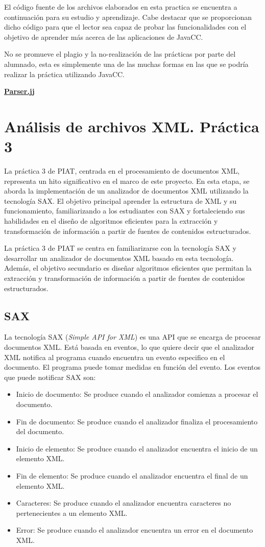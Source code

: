 \noindent El código fuente de los archivos elaborados en esta practica se encuentra a continuación para su estudio y aprendizaje. Cabe destacar que se proporcionan dicho código para que el lector sea capaz de probar las funcionalidades con el objetivo de aprender más acerca de las aplicaciones de JavaCC.

No se promueve el plagio y la no-realización de las prácticas por parte del alumnado, esta es simplemente una de las muchas formas en las que se podría realizar la práctica utilizando JavaCC.

\hyperref[sec:P2Parser]{\textbf{Parser.jj}}

\section{Análisis de archivos XML. Práctica 3}

\noindent La práctica 3 de PIAT, centrada en el procesamiento de documentos XML, representa un hito significativo en el marco de este proyecto. En esta etapa, se aborda la implementación de un analizador de documentos XML utilizando la tecnología SAX. El objetivo principal aprender la estructura de XML y su funcionamiento, familiarizando a los estudiantes con SAX y fortaleciendo sus habilidades en el diseño de algoritmos eficientes para la extracción y transformación de información a partir de fuentes de contenidos estructurados.

La práctica 3 de PIAT se centra en familiarizarse con la tecnología SAX y desarrollar un analizador de documentos XML basado en esta tecnología. Además, el objetivo secundario es diseñar algoritmos eficientes que permitan la extracción y transformación de información a partir de fuentes de contenidos estructurados.

\subsection{SAX}
\noindent La tecnología SAX (\textit{Simple API for XML}) es una API que se encarga de procesar documentos XML. Está basada en eventos, lo que quiere decir que el analizador XML notifica al programa cuando encuentra un evento especifico en el documento. El programa puede tomar medidas en función del evento. Los eventos que puede notificar SAX son:
\begin{itemize}
    \item Inicio de documento: Se produce cuando el analizador comienza a procesar el documento.
    \item Fin de documento: Se produce cuando el analizador finaliza el procesamiento del documento.
    \item Inicio de elemento: Se produce cuando el analizador encuentra el inicio de un elemento XML.
    \item Fin de elemento: Se produce cuando el analizador encuentra el final de un elemento XML.
    \item Caracteres: Se produce cuando el analizador encuentra caracteres no pertenecientes a un elemento XML.
    \item Error: Se produce cuando el analizador encuentra un error en el documento XML.
\end{itemize}

